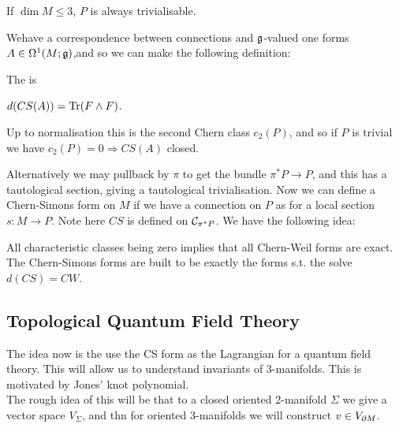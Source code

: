 \documentclass{article}
\begin{document}
\begin{remark}
	If $\dim M \leq 3$, $P$ is always trivialisable. 
\end{remark}
Wehave a correspondence between connections and $\mathfrak{g}$-valued one forms $A \in \Omega^1(M;\mathfrak{g})$,and so we can make the following definition:
\begin{definition}
	The  is 
\end{definition}

\begin{lemma}
	$d(CS(A)) = \operatorname{Tr}(F \wedge F)$. 
\end{lemma}
\begin{remark}
	Up to normalisation this is the second Chern class $c_2(P)$, and so if $P$ is trivial we have $c_2(P)=0 \Rightarrow CS(A)$ closed. 
\end{remark}

Alternatively we may pullback by $\pi$ to get the bundle $\pi^\ast P \to P$, and this has a tautological section, giving a tautological trivialisation. Now we can define a Chern-Simons form on $M$ if we have a connection on $P$ as 
for a local section $s:M \to P$. Note here $CS$ is defined on $\mathcal{C}_{\pi^\ast P}$. We have the following idea:
\begin{idea}
	All characteristic classes being zero implies that all Chern-Weil forms are exact. The Chern-Simons forms are built to be exactly the forms s.t. the solve $d(CS) = CW$.  
\end{idea}
\subsection{Topological Quantum Field Theory}
\begin{idea}
The idea now is the use the CS form as the Lagrangian for a quantum field theory. This will allow us to understand invariants of 3-manifolds. This is motivated by Jones' knot polynomial. \\
The rough idea of this will be that to a closed oriented 2-manifold $\Sigma$ we give a vector space $V_\Sigma$, and thn for oriented 3-manifolds we will construct $v \in V_{\partial M}$. 
\end{idea}
\end{document}
